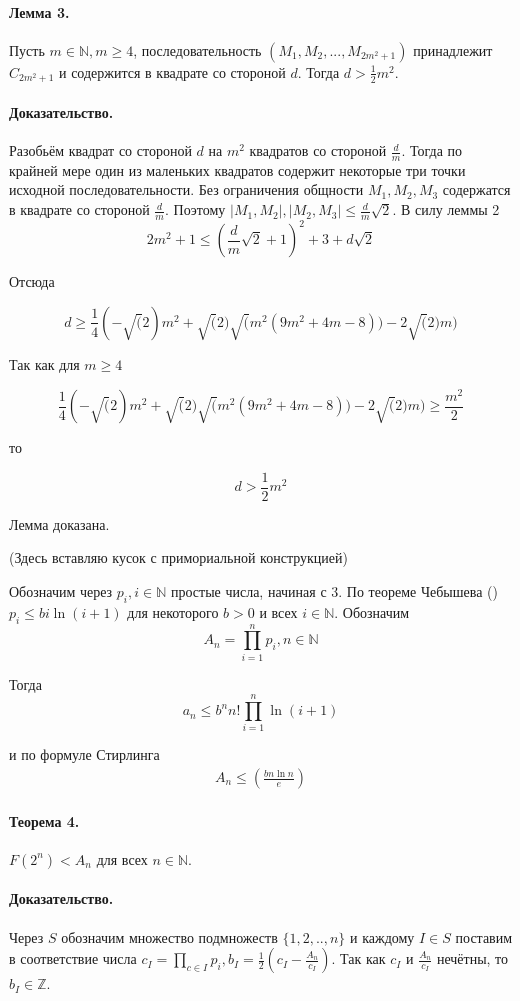\documentclass[a4paper,14pt]{article} %
\begin{document}
\paragraph{Лемма 3.}
Пусть $m\in\mathbb{N}, m\geq 4$, последовательность $(M_1,M_2,...,M_{2m^2+1})$ принадлежит $C_{2m^2+1}$ и содержится в квадрате со стороной $d$.
Тогда $d>\frac{1}{2}m^2$.

\paragraph{Доказательство.} Разобьём квадрат со стороной $d$ на $m^2$ квадратов со стороной $\frac{d}{m}$.
Тогда по крайней мере один из маленьких квадратов содержит некоторые три точки исходной последовательности.
Без ограничения общности $M_1,M_2,M_3$ содержатся в квадрате со стороной $\frac{d}{m}$.
Поэтому $|M_1,M_2|,|M_2,M_3| \leq \frac{d}{m}\sqrt{2}$.
В силу леммы 2
$$
2m^2+1 \leq\left(\frac{d}{m}\sqrt{2}+1\right)^2+3+d\sqrt{2}
$$

Отсюда

$$
d\geq\frac{1}{4} (-\sqrt(2) m^2+\sqrt(2) \sqrt(m^2 (9 m^2+4 m-8))-2 \sqrt(2) m)
$$

Так как для $m\geq 4$

$$
\frac{1}{4} (-\sqrt(2) m^2+\sqrt(2) \sqrt(m^2 (9 m^2+4 m-8))-2 \sqrt(2) m) \geq \frac{m^2}{2}
$$

то

$$
d>\frac{1}{2}m^2
$$

Лемма доказана.

(Здесь вставляю кусок с примориальной конструкцией)


Обозначим через $p_i, i\in\mathbb{N}$ простые числа, начиная с 3.
По теореме Чебышева (\cite{Buhshtab}) $p_i \leq bi\ln(i+1)$ для некоторого $b>0$ и всех $i\in\mathbb{N}$.
Обозначим
$$
A_n=\prod_{i=1}^{n} p_i, n\in\mathbb{N}
$$

Тогда
$$
a_n\leq b^n n! \prod_{i=1}^{n} \ln(i+1)
$$

и по формуле Стирлинга
\begin{multline*}
A_n\leq \left(\frac{bn\ln n}{e}\right)
\end{multline*}


\paragraph{Теорема 4.}
$F(2^n)<A_n$ для всех $n\in\mathbb{N}$.

\paragraph{Доказательство.} Через $S$ обозначим множество подмножеств $\{1,2,..,n\}$ и каждому $I\in S$ поставим в соответствие числа $c_I=\prod\limits_{c\in I}p_i, b_I=\frac{1}{2}\left(c_I-\frac{A_n}{c_I}\right)$.
Так как $c_I$ и $\frac{A_n}{c_I}$ нечётны, то $b_I \in \mathbb{Z}$.
\end{document}
